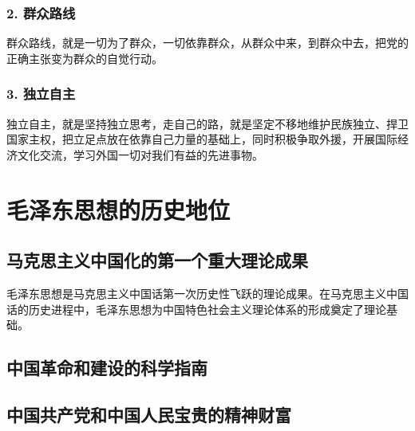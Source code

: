    \subsubsection{2. 群众路线} 群众路线，就是一切为了群众，一切依靠群众，从群众中来，到群众中去，把党的正确主张变为群众的自觉行动。

    \subsubsection{3. 独立自主} 独立自主，就是坚持独立思考，走自己的路，就是坚定不移地维护民族独立、捍卫国家主权，把立足点放在依靠自己力量的基础上，同时积极争取外援，开展国际经济文化交流，学习外国一切对我们有益的先进事物。


\section{毛泽东思想的历史地位}

    \subsection{马克思主义中国化的第一个重大理论成果}
    毛泽东思想是马克思主义中国话第一次历史性飞跃的理论成果。在马克思主义中国话的历史进程中，毛泽东思想为中国特色社会主义理论体系的形成奠定了理论基础。

    \subsection{中国革命和建设的科学指南}

    \subsection{中国共产党和中国人民宝贵的精神财富}